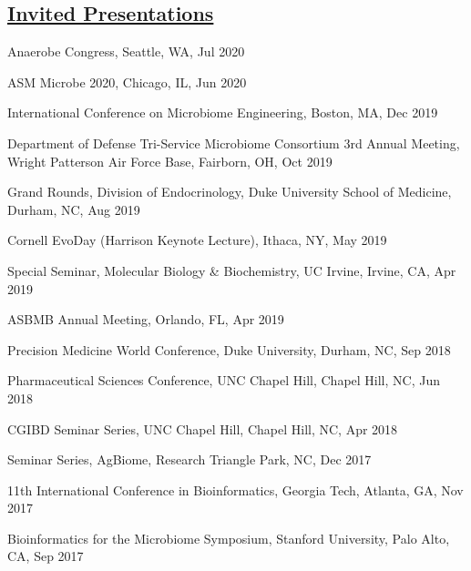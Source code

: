 \documentclass[overlapped,line,11pt]{res}
\begin{document}
\begin{resume}
\section{\underline{\sc Invited Presentations}}
\vspace{.25in}

\begin{revnumerate}[69]

\item {Anaerobe Congress, Seattle, WA, Jul 2020 }

\item {ASM Microbe 2020, Chicago, IL, Jun 2020 }

\item {International Conference on Microbiome Engineering, Boston, MA, Dec 2019 }

\item {Department of Defense Tri-Service Microbiome Consortium 3rd
  Annual Meeting, Wright Patterson Air Force Base, Fairborn, OH, Oct
  2019 }

\item {Grand Rounds, Division of Endocrinology, Duke University School of
  Medicine, Durham, NC, Aug 2019
  }

\item {Cornell EvoDay (Harrison Keynote Lecture), Ithaca, NY, May 2019}

\item {Special Seminar, Molecular Biology \& Biochemistry, UC Irvine, Irvine, CA, Apr 2019}

\item {ASBMB Annual Meeting, Orlando, FL, Apr 2019}

\item {Precision Medicine World Conference, Duke University, Durham, NC, Sep 2018}

\item {Pharmaceutical Sciences Conference, UNC Chapel Hill, Chapel Hill, NC, Jun 2018}

\item {CGIBD Seminar Series, UNC Chapel Hill, Chapel Hill, NC, Apr 2018}

\item {Seminar Series, AgBiome, Research Triangle Park, NC, Dec 2017}

\item {11th International Conference in Bioinformatics, Georgia Tech, Atlanta, GA, Nov 2017}

\item {Bioinformatics for the Microbiome Symposium, Stanford University, Palo Alto, CA, Sep 2017}


\end{revnumerate}
\end{resume}
\end{document}
